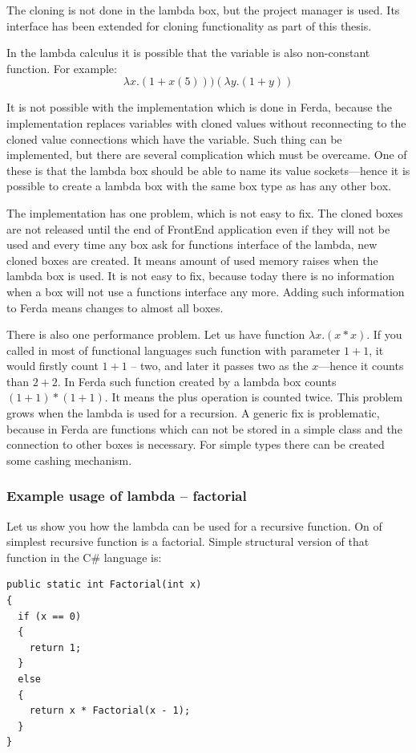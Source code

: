\documentclass[a4paper,12pt]{book}
\begin{document}
The cloning is not done in the lambda box, but the project manager is used. Its interface has been extended for cloning functionality as part of this thesis.

In the lambda calculus it is possible that the variable is also non-constant function. For example:
\begin{equation}
\lambda x.(1+x(5)))(\lambda y.(1+y))
\end{equation}

It is not possible with the implementation which is done in Ferda, because the implementation replaces variables with cloned values without reconnecting to the cloned value connections which have the variable. Such thing can be implemented, but there are several complication which must be overcame. One of these is that the lambda box should be able to name its value sockets---hence it is possible to create a lambda box with the same box type as has any other box.

The implementation has one problem, which is not easy to fix. The cloned boxes are not released until the end of FrontEnd application even if they will not be used and every time any box ask for functions interface of the lambda, new cloned boxes are created. It means amount of used memory raises when the lambda box is used. It is not easy to fix, because today there is no information when a box will not use a functions interface any more. Adding such information to Ferda means changes to almost all boxes.

There is also one performance problem. Let us have function $\lambda x.(x*x)$. If you called in most of functional languages such function with parameter $1+1$, it would firstly count $1+1$ -- two, and later it passes two as the $x$---hence it counts than $2+2$. In Ferda such function created by a lambda box counts $(1+1)*(1+1)$. It means the plus operation is counted twice. This problem grows when the lambda is used for a recursion. A generic fix is problematic, because in Ferda are functions which can not be stored in a simple class and the connection to other boxes is necessary. For simple types there can be created some cashing mechanism.

\subsubsection{Example usage of lambda -- factorial}
Let us show you how the lambda can be used for a recursive function. On of simplest recursive function is a factorial. Simple structural version of that function in the C\# language is: 
\begin{verbatim}
public static int Factorial(int x)
{
  if (x == 0)
  {
    return 1;
  }
  else
  {
    return x * Factorial(x - 1);
  }
}
\end{verbatim}
	
\end{document}
